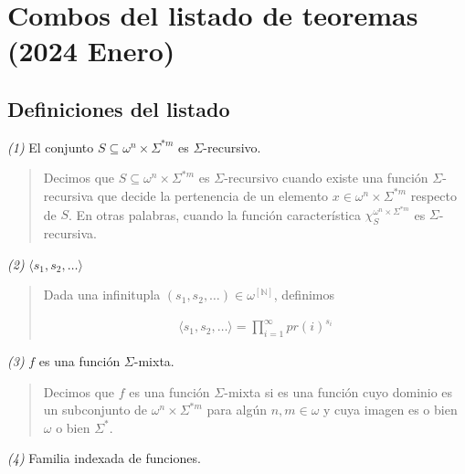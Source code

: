 \documentclass[a4paper, 12pt]{article}
\begin{document}
\pagebreak 

\section{Combos del listado de teoremas (2024 Enero)}

\subsection{Definiciones del listado}

\textit{(1)} El conjunto $S \subseteq \omega^{n} \times \Sigma^{*m} $ es
$\Sigma$-recursivo.


\small
\begin{quote}

Decimos que $S \subseteq \omega^{n} \times \Sigma^{*m} $ es $\Sigma$-recursivo
cuando existe una función $\Sigma$-recursiva que decide la pertenencia de un
elemento $x \in \omega^{n} \times \Sigma^{*m} $ respecto de $S$. En otras
palabras, cuando la función característica $\chi_{S}^{\omega^{n} \times
\Sigma^{*m} }$ es $\Sigma$-recursiva.

\end{quote}
\normalsize

\textit{(2)} $\langle s_1, s_2, \ldots \rangle $


\small
\begin{quote}

    Dada una infinitupla $(s_1, s_2, \ldots) \in \omega^{[\mathbb{N}]}$,
    definimos 

    \begin{align*}
        \langle s_1, s_2, \ldots \rangle  = \prod_{i=1}^{\infty} pr(i)^{s_i}
    \end{align*}



\end{quote}
\normalsize

\textit{(3)} $f$ es una función $\Sigma$-mixta.


\small
\begin{quote}

    Decimos que $f$ es una función $\Sigma$-mixta si es una función cuyo dominio
    es un subconjunto de $\omega^{n} \times \Sigma^{*m} $ para algún $n, m \in
    \omega$ y cuya imagen es o bien $\omega$ o bien $\Sigma^{*}$.

\end{quote}
\normalsize

\textit{(4)} Familia indexada de funciones.
\end{document}
